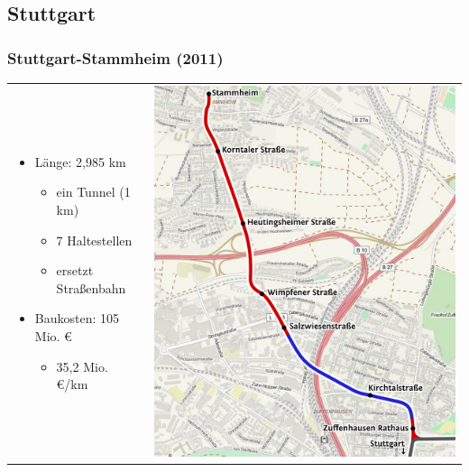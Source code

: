 \documentclass[xcolor=dvipsnames]{beamer}
\begin{document}
\subsection{Stuttgart}
\begin{frame}
  \frametitle{Stuttgart-Stammheim (2011)}

  \begin{tabular}{lc}
    \begin{minipage}{.45\linewidth}
      \begin{itemize}
      \item Länge: 2,985 km
        \begin{itemize}
        \item ein Tunnel (1 km)
        \item 7 Haltestellen
        \item ersetzt Straßenbahn
        \end{itemize}
      \item Baukosten: 105 Mio. €
        \begin{itemize}
        \item 35,2 Mio. €/km
        \end{itemize}
      \end{itemize}
    \end{minipage}
    &
    \begin{minipage}{.55\linewidth}
      \includegraphics[height=.8\textheight]{data/Stuttgart.png}
    \end{minipage}
  \end{tabular}
\end{frame}
\end{document}
